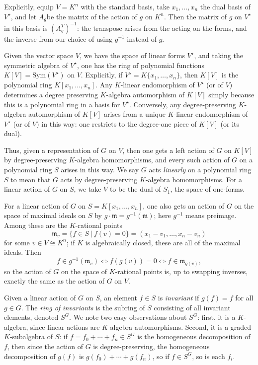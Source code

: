 \documentclass[12pt]{amsart}
\theoremstyle{definition}
\numberwithin{equation}{theorem}
\def\frakm{\mathfrak{m}}
\begin{document}
Explicitly, equip $V=K^n$ with the standard basis, take $x_1,\dots,x_n$ the dual basis of $V^\star$, and let $A_g$be the matrix of the action of $g$ on $K^n$. Then the matrix of $g$ on $V^\star$ in this basis is $(A_g^T)^{-1}$: the transpose arises from the acting on the forms, and the inverse from our choice of using $g^{-1}$ instead of $g$.

Given the vector space $V$, we have the space of linear forms $V^\star$, and taking the symmetric algebra of $V^\star$, one has the ring of polynomial functions $K[V]=\mathrm{Sym}(V^\star)$ on $V$. Explicitly, if $V^\star= K\{ x_1,\dots,x_n\}$, then $K[V]$ is the polynomial ring $K[x_1,\dots,x_n]$. Any $K$-linear endomorphism of $V^\star$ (or of $V$) determines a degree preserving $K$-algebra automorphism of $K[V]$ simply because this is a polynomial ring in a basis for $V^\star$. Conversely, any degree-preserving $K$-algebra automorphism of $K[V]$ arises from a unique $K$-linear endomorphism of $V^\star$ (or of $V$) in this way: one restricts to the degree-one piece of $K[V]$ (or its dual).

Thus, given a representation of $G$ on $V$, then one gets a left action of $G$ on $K[V]$ by degree-preserving $K$-algebra homomorphisms, and every such action of $G$ on a polynomial ring $S$ arises in this way. We say $G$ acts \emph{linearly} on a polynomial ring $S$ to mean that $G$ acts by degree-preserving $K$-algebra homomorphisms. For a linear action of $G$ on $S$, we take $V$ to be the dual of $S_1$, the space of one-forms.

For a linear action of $G$ on $S=K[x_1,\dots,x_n]$, one also gets an action of $G$ on the space of maximal ideals on $S$ by $g \cdot \frakm = g^{-1}( \frakm)$; here $g^{-1}$ means preimage. Among these are the $K$-rational points \[ \frakm_v = \{  f \in S \ | \ f(v)= 0\} = (x_1-v_1,\dots,x_n-v_n)\]
for some $v\in V\cong K^n$; if $K$ is algebraically closed, these are all of the maximal ideals. Then 
\[ f\in g^{-1}(\frakm_v) \Longleftrightarrow f(g(v)) = 0  \Longleftrightarrow f\in \frakm_{g(v)}, \]
so the action of $G$ on the space of $K$-rational points is, up to swapping inverses, exactly the same as the action of $G$ on $V$.

Given a linear action of $G$ on $S$, an element $f\in S$ is \emph{invariant} if $g(f)=f$ for all $g\in G$. The \emph{ring of invariants} is the subring of $S$ consisting of all invariant elements, denoted $S^G$. We note two easy observations about $S^G$: first, it is a $K$-algebra, since linear actions are \mbox{$K$-algebra} automorphisms. Second, it is a graded $K$-subalgebra of $S$: if $f = f_0 + \cdots+ f_n \in S^G$ is the homogeneous decomposition of $f$, then since the action of $G$ is degree-preserving, the homogeneous decomposition of $g(f)$ is $g(f_0) + \cdots + g(f_n)$, so if $f\in S^G$, so is each $f_i$.
\end{document}

